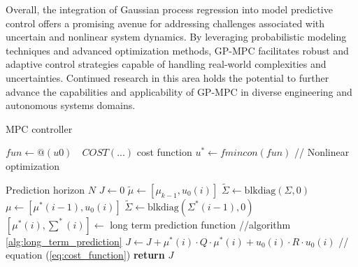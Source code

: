 Overall, the integration of Gaussian process regression into model predictive control offers a promising avenue for addressing challenges associated with uncertain and nonlinear system dynamics. By leveraging probabilistic modeling techniques and advanced optimization methods, GP-MPC facilitates robust and adaptive control strategies capable of handling real-world complexities and uncertainties. Continued research in this area holds the potential to further advance the capabilities and applicability of GP-MPC in diverse engineering and autonomous systems domains.

\begin{algorithm}
\caption{MPC controller }
\label{alg:mpc}
\renewcommand{\algorithmicrequire}{\textbf{Input:}}
\renewcommand{\algorithmicensure}{\textbf{Output:}}
    \begin{algorithmic}
    \end{algorithmic}
    
    \begin{algorithmic}
    \State $fun \gets @(u0) \quad COST(...) $  \qquad \qquad cost function 
    \State $u^* \gets fmincon(fun)$ \qquad \qquad // Nonlinear optimization  \\ 
    \end{algorithmic}


\begin{algorithmic}[1]
    \State Prediction horizon $N$
    \State $J \gets 0$
            \State $\tilde{\mu} \gets [\mu_{k-1}, u_0(i)]$
            \State $\tilde{\Sigma} \gets \text{blkdiag}(\Sigma, 0)$
        \Else
            \State $\mu \gets [\mu^*(i-1), u_0(i)]$
            \State $\tilde{\Sigma} \gets \text{blkdiag}(\Sigma^*(i-1), 0)$
        \EndIf
    \State $[\mu^*(i), \sum^*(i)] \gets $ long term prediction function \qquad \qquad //algorithm \ref{alg:long_term_prediction}
            \State $J \gets J + \mu^*(i) \cdot Q \cdot \mu^*(i) + u_0(i) \cdot R \cdot u_0(i)$ \qquad \qquad // equation  (\ref{eq:cost_function})
    \EndFor
    \State \textbf{return} $J$
\EndFunction
\end{algorithmic}

\end{algorithm}


